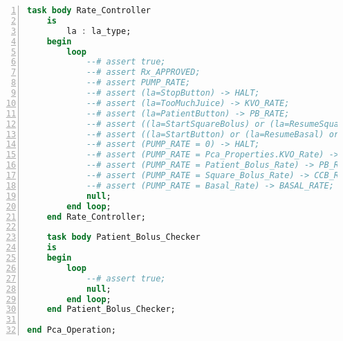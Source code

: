 \begin{lstlisting}[language=ada, gobble=0, numbers=left, caption={\lstinline{Pca_Operation} package}, label={listing:pca_generated:pca_operation}]
    task body Rate_Controller
    is
        la : la_type;
    begin
        loop
            --# assert true;
            --# assert Rx_APPROVED;
            --# assert PUMP_RATE;
            --# assert (la=StopButton) -> HALT;
            --# assert (la=TooMuchJuice) -> KVO_RATE;
            --# assert (la=PatientButton) -> PB_RATE;
            --# assert ((la=StartSquareBolus) or (la=ResumeSquareBolus)) -> CCB_RATE;
            --# assert ((la=StartButton) or (la=ResumeBasal) or (la=SquareBolusDone)) -> BASAL_RATE;
            --# assert (PUMP_RATE = 0) -> HALT;
            --# assert (PUMP_RATE = Pca_Properties.KVO_Rate) -> KVO_RATE;
            --# assert (PUMP_RATE = Patient_Bolus_Rate) -> PB_RATE;
            --# assert (PUMP_RATE = Square_Bolus_Rate) -> CCB_RRATE;
            --# assert (PUMP_RATE = Basal_Rate) -> BASAL_RATE;
            null;
        end loop;
    end Rate_Controller;

    task body Patient_Bolus_Checker
    is
    begin
        loop
            --# assert true;
            null;
        end loop;
    end Patient_Bolus_Checker;

end Pca_Operation;
\end{lstlisting} 
\doublespacing

